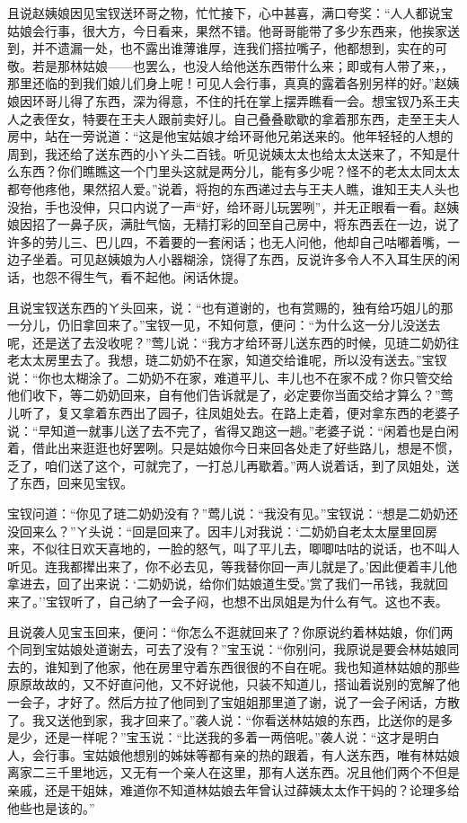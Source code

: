且说赵姨娘因见宝钗送环哥之物，忙忙接下，心中甚喜，满口夸奖：``人人都说宝姑娘会行事，很大方，今日看来，果然不错。他哥哥能带了多少东西来，他挨家送到，并不遗漏一处，也不露出谁薄谁厚，连我们搭拉嘴子，他都想到，实在的可敬。若是那林姑娘------也罢么，也没人给他送东西带什么来；即或有人带了来，，那里还临的到我们娘儿们身上呢！可见人会行事，真真的露着各别另样的好。''赵姨娘因环哥儿得了东西，深为得意，不住的托在掌上摆弄瞧看一会。想宝钗乃系王夫人之表侄女，特要在王夫人跟前卖好儿。自己叠叠歇歇的拿着那东西，走至王夫人房中，站在一旁说道：``这是他宝姑娘才给环哥他兄弟送来的。他年轻轻的人想的周到，我还给了送东西的小ㄚ头二百钱。听见说姨太太也给太太送来了，不知是什么东西？你们瞧瞧这一个门里头这就是两分儿，能有多少呢？怪不的老太太同太太都夸他疼他，果然招人爱。''说着，将抱的东西递过去与王夫人瞧，谁知王夫人头也没抬，手也没伸，只口内说了一声``好，给环哥儿玩罢咧''，并无正眼看一看。赵姨娘因招了一鼻子灰，满肚气恼，无精打彩的回至自己房中，将东西丢在一边，说了许多的劳儿三、巴儿四，不着要的一套闲话；也无人问他，他却自己咕嘟着嘴，一边子坐着。可见赵姨娘为人小器糊涂，饶得了东西，反说许多令人不入耳生厌的闲话，也怨不得生气，看不起他。闲话休提。

且说宝钗送东西的ㄚ头回来，说：``也有道谢的，也有赏赐的，独有给巧姐儿的那一分儿，仍旧拿回来了。''宝钗一见，不知何意，便问：``为什么这一分儿没送去呢，还是送了去没收呢？''莺儿说：``我方才给环哥儿送东西的时候，见琏二奶奶往老太太房里去了。我想，琏二奶奶不在家，知道交给谁呢，所以没有送去。''宝钗说：``你也太糊涂了。二奶奶不在家，难道平儿、丰儿也不在家不成？你只管交给他们收下，等二奶奶回来，自有他们告诉就是了，必定要你当面交给才算么？''莺儿听了，复又拿着东西出了园子，往凤姐处去。在路上走着，便对拿东西的老婆子说：``早知道一就事儿送了去不完了，省得又跑这一趟。''老婆子说：``闲着也是白闲着，借此出来逛逛也好罢咧。只是姑娘你今日来回各处走了好些路儿，想是不惯，乏了，咱们送了这个，可就完了，一打总儿再歇着。''两人说着话，到了凤姐处，送了东西，回来见宝钗。

宝钗问道：``你见了琏二奶奶没有？''莺儿说：``我没有见。''宝钗说：``想是二奶奶还没回来么？''ㄚ头说：``回是回来了。因丰儿对我说：`二奶奶自老太太屋里回房来，不似往日欢天喜地的，一脸的怒气，叫了平儿去，唧唧咕咕的说话，也不叫人听见。连我都撵出来了，你不必去见，等我替你回一声儿就是了。'因此便着丰儿他拿进去，回了出来说：`二奶奶说，给你们姑娘道生受。'赏了我们一吊钱，我就回来了。''宝钗听了，自己纳了一会子闷，也想不出凤姐是为什么有气。这也不表。

且说袭人见宝玉回来，便问：``你怎么不逛就回来了？你原说约着林姑娘，你们两个同到宝姑娘处道谢去，可去了没有？''宝玉说：``你别问，我原说是要会林姑娘同去的，谁知到了他家，他在房里守着东西很很的不自在呢。我也知道林姑娘的那些原原故故的，又不好直问他，又不好说他，只装不知道儿，搭讪着说别的宽解了他一会子，才好了。然后方拉了他同到了宝姐姐那里道了谢，说了一会子闲话，方散了。我又送他到家，我才回来了。''袭人说：``你看送林姑娘的东西，比送你的是多是少，还是一样呢？''宝玉说：``比送我的多着一两倍呢。''袭人说：``这才是明白人，会行事。宝姑娘他想别的姊妹等都有亲的热的跟着，有人送东西，唯有林姑娘离家二三千里地远，又无有一个亲人在这里，那有人送东西。况且他们两个不但是亲戚，还是干姐妹，难道你不知道林姑娘去年曾认过薛姨太太作干妈的？论理多给他些也是该的。''

